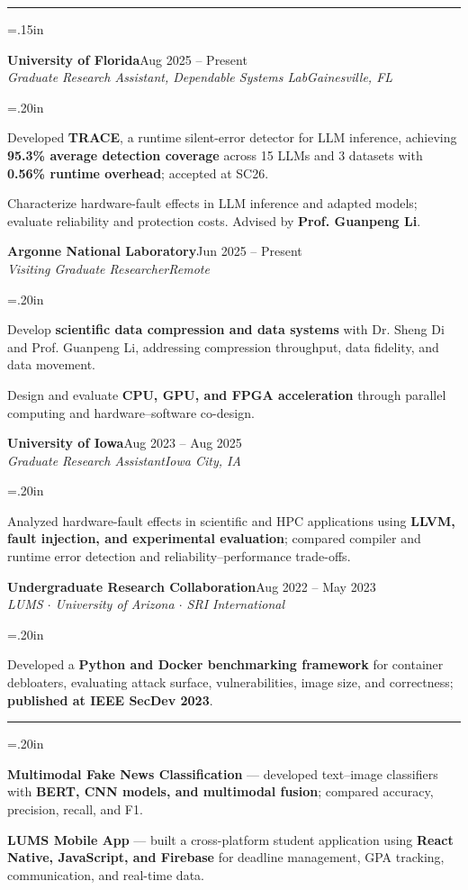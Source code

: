 \documentclass[letterpaper,11pt]{article}
\renewcommand{\section}[1]{\par\vspace{9pt}{\scshape\large #1\par}\vspace{2pt}\hrule\vspace{4pt}}
\newcommand{\resumeItem}[1]{\item\small{#1}}
\newcommand{\resumeSubheading}[4]{\item\textbf{#1}\hfill #2\\\textit{\small #3}\hfill\textit{\small #4}\par\vspace{-5pt}}
\newcommand{\resumeSubHeadingListStart}{\begin{list}{}{\leftmargin=.15in\itemsep=0pt\topsep=0pt\parsep=0pt\partopsep=0pt}}
\newcommand{\resumeSubHeadingListEnd}{\end{list}}
\newcommand{\resumeItemListStart}{\begin{list}{\textbullet}{\leftmargin=.20in\itemsep=2pt\topsep=2pt\parsep=0pt\partopsep=0pt}}
\newcommand{\resumeItemListEnd}{\end{list}\vspace{-3pt}}
\begin{document}
\section{Experience}
\resumeSubHeadingListStart
  \resumeSubheading{University of Florida}{Aug 2025 -- Present}{Graduate Research Assistant, Dependable Systems Lab}{Gainesville, FL}
  \vspace{2pt}
  \resumeItemListStart
    \resumeItem{Developed \textbf{TRACE}, a runtime silent-error detector for LLM inference, achieving \textbf{95.3\% average detection coverage} across 15 LLMs and 3 datasets with \textbf{0.56\% runtime overhead}; accepted at SC26.}
    \resumeItem{Characterize hardware-fault effects in LLM inference and adapted models; evaluate reliability and protection costs. Advised by \textbf{Prof. Guanpeng Li}.}
  \resumeItemListEnd
  \vspace{4pt}
  \resumeSubheading{Argonne National Laboratory}{Jun 2025 -- Present}{Visiting Graduate Researcher}{Remote}
  \vspace{2pt}
  \resumeItemListStart
    \resumeItem{Develop \textbf{scientific data compression and data systems} with Dr. Sheng Di and Prof. Guanpeng Li, addressing compression throughput, data fidelity, and data movement.}
    \resumeItem{Design and evaluate \textbf{CPU, GPU, and FPGA acceleration} through parallel computing and hardware--software co-design.}
  \resumeItemListEnd
  \vspace{4pt}
  \resumeSubheading{University of Iowa}{Aug 2023 -- Aug 2025}{Graduate Research Assistant}{Iowa City, IA}
  \vspace{2pt}
  \resumeItemListStart
    \resumeItem{Analyzed hardware-fault effects in scientific and HPC applications using \textbf{LLVM, fault injection, and experimental evaluation}; compared compiler and runtime error detection and reliability--performance trade-offs.}
  \resumeItemListEnd
  \vspace{4pt}
  \resumeSubheading{Undergraduate Research Collaboration}{Aug 2022 -- May 2023}{LUMS $\cdot$ University of Arizona $\cdot$ SRI International}{}
  \vspace{2pt}
  \resumeItemListStart
    \resumeItem{Developed a \textbf{Python and Docker benchmarking framework} for container debloaters, evaluating attack surface, vulnerabilities, image size, and correctness; \textbf{published at IEEE SecDev 2023}.}
  \resumeItemListEnd
\resumeSubHeadingListEnd

\vspace{-8pt}
\section{Technical Projects}
\resumeItemListStart
  \resumeItem{\textbf{Multimodal Fake News Classification} --- developed text--image classifiers with \textbf{BERT, CNN models, and multimodal fusion}; compared accuracy, precision, recall, and F1.}
  \resumeItem{\textbf{LUMS Mobile App} --- built a cross-platform student application using \textbf{React Native, JavaScript, and Firebase} for deadline management, GPA tracking, communication, and real-time data.}
\resumeItemListEnd
\end{document}
